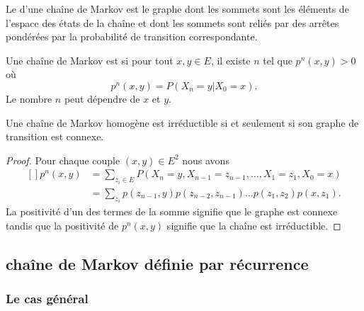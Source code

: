 Le  d'une chaîne de Markov est le graphe dont les sommets sont les éléments de l'espace des états de la chaîne et dont les sommets sont reliés par des arrêtes pondérées par la probabilité de transition correspondante.

\begin{definition}
    Une chaîne de Markov est  si pour tout \( x,y\in E\), il existe \( n\) tel que \( p^n(x,y)>0\) où 
    \begin{equation}
        p^n(x,y)=P(X_n=y|X_0=x).
    \end{equation}
    Le nombre \( n\) peut dépendre de \( x\) et \( y\).
\end{definition}

\begin{lemma}
    Une chaîne de Markov homogène est irréductible si et seulement si son graphe de transition est connexe.
\end{lemma}

\begin{proof}
    Pour chaque couple \( (x,y)\in E^2\) nous avons
    \begin{equation}
        \begin{aligned}[]
            p^n(x,y)&=\sum_{z_i\in E}P(X_n=y,X_{n-1}=z_{n-1},\ldots,X_1=z_1,X_0=x)\\
            &=\sum_{z_i}p(z_{n-1},y)p(z_{n-2},z_{n-1})\ldots p(z_1,z_2)p(x,z_1).
        \end{aligned}
    \end{equation}
    La positivité d'un des termes de la somme signifie que le graphe est connexe tandis que la positivité de \( p^n(x,y)\) signifie que la chaîne est irréductible.
\end{proof}

\subsection{chaîne de Markov définie par récurrence}

\subsubsection{Le cas général}

